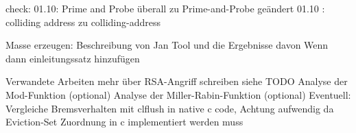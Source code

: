 check: 01.10: Prime and Probe überall zu Prime-and-Probe geändert
01.10 : colliding address zu colliding-address

Masse erzeugen:
Beschreibung von Jan Tool und die Ergebnisse davon
Wenn dann einleitungssatz hinzufügen

Verwandete Arbeiten mehr über RSA-Angriff schreiben siehe TODO
Analyse der Mod-Funktion (optional)
Analyse der Miller-Rabin-Funktion (optional)
Eventuell: Vergleiche Bremsverhalten mit clflush in native c code,
Achtung aufwendig da Eviction-Set Zuordnung in c implementiert werden muss



